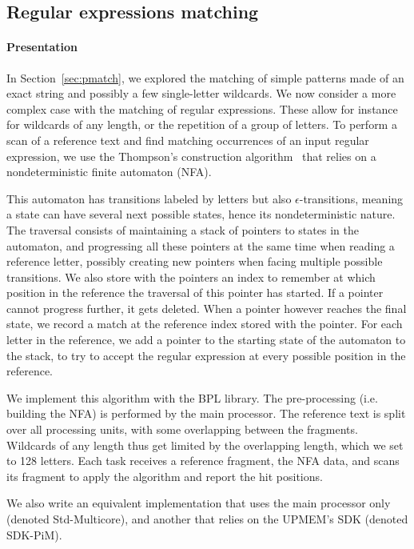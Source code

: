 \subsection{Regular expressions matching}
\label{sec:rematch}

\paragraph{Presentation}

In Section~\ref{sec:pmatch}, we explored the matching of simple patterns made of an exact string and possibly a few single-letter wildcards.
We now consider a more complex case with the matching of regular expressions.
These allow for instance for wildcards of any length, or the repetition of a group of letters.
To perform a scan of a reference text and find matching occurrences of an input regular expression, we use the Thompson's construction algorithm~\cite{Thompson1968} that relies on a nondeterministic finite automaton (NFA).

This automaton has transitions labeled by letters but also $\epsilon$-transitions, meaning a state can have several next possible states, hence its nondeterministic nature.
The traversal consists of maintaining a stack of pointers to states in the automaton, and progressing all these pointers at the same time when reading a reference letter, possibly creating new pointers when facing multiple possible transitions.
We also store with the pointers an index to remember at which position in the reference the traversal of this pointer has started.
If a pointer cannot progress further, it gets deleted.
When a pointer however reaches the final state, we record a match at the reference index stored with the pointer.
For each letter in the reference, we add a pointer to the starting state of the automaton to the stack, to try to accept the regular expression at every possible position in the reference.

We implement this algorithm with the BPL library.
The pre-processing (i.e. building the NFA) is performed by the main processor.
The reference text is split over all processing units, with some overlapping between the fragments.
Wildcards of any length thus get limited by the overlapping length, which we set to 128 letters.
Each task receives a reference fragment, the NFA data, and scans its fragment to apply the algorithm and report the hit positions.

We also write an equivalent implementation that uses the main processor only (denoted Std-Multicore), and another that relies on the UPMEM's SDK (denoted SDK-PiM).
 
